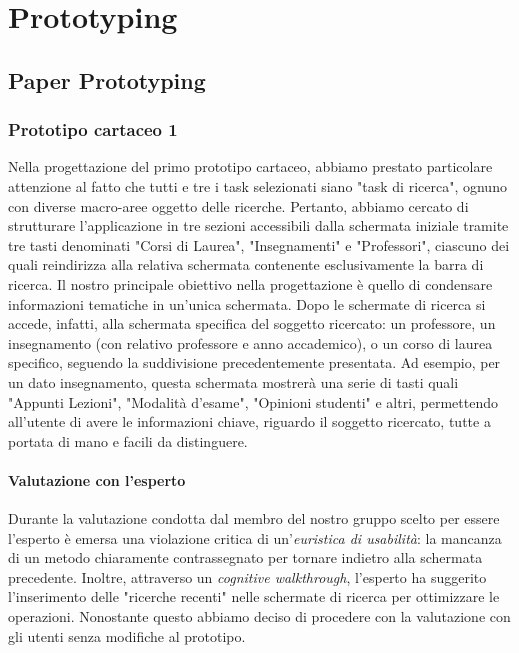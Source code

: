 \chapter{Prototyping}

\section{Paper Prototyping}

\subsection{Prototipo cartaceo 1}
Nella progettazione del primo prototipo cartaceo, abbiamo prestato particolare attenzione al fatto che tutti e tre i task selezionati
siano "task di ricerca", ognuno con diverse macro-aree oggetto delle ricerche. Pertanto, abbiamo cercato di strutturare l'applicazione
in tre sezioni accessibili dalla schermata iniziale tramite tre tasti denominati "Corsi di Laurea", "Insegnamenti" e "Professori", ciascuno
dei quali reindirizza alla relativa schermata contenente esclusivamente la barra di ricerca.
Il nostro principale obiettivo nella progettazione è quello di condensare informazioni tematiche in un'unica schermata. Dopo le schermate
di ricerca si accede, infatti, alla schermata specifica del soggetto ricercato: un professore, un insegnamento (con relativo professore e
anno accademico), o un corso di laurea specifico, seguendo la suddivisione precedentemente presentata. Ad esempio, per un dato insegnamento,
questa schermata mostrerà una serie di tasti quali "Appunti Lezioni", "Modalità d'esame", "Opinioni studenti" e altri, permettendo all'utente
di avere le informazioni chiave, riguardo il soggetto ricercato, tutte a portata di mano e facili da distinguere.


\subsubsection{Valutazione con l'esperto}
Durante la valutazione condotta dal membro del nostro gruppo scelto per essere l'esperto è emersa una violazione critica di un'\textit{euristica di
usabilità}: la mancanza di un metodo chiaramente contrassegnato per tornare indietro alla schermata precedente.
Inoltre, attraverso un \textit{cognitive walkthrough}, l'esperto ha suggerito l'inserimento delle "ricerche recenti" nelle schermate di ricerca per ottimizzare le operazioni.
Nonostante questo abbiamo deciso di procedere con la valutazione con gli utenti senza modifiche al prototipo.


